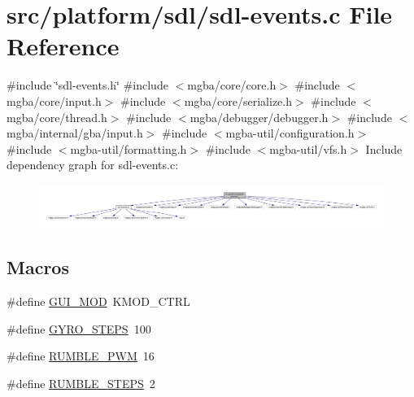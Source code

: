 \hypertarget{sdl-events_8c}{}\section{src/platform/sdl/sdl-\/events.c File Reference}
\label{sdl-events_8c}
{\ttfamily \#include \char`\"{}sdl-\/events.\+h\char`\"{}}\newline
{\ttfamily \#include $<$mgba/core/core.\+h$>$}\newline
{\ttfamily \#include $<$mgba/core/input.\+h$>$}\newline
{\ttfamily \#include $<$mgba/core/serialize.\+h$>$}\newline
{\ttfamily \#include $<$mgba/core/thread.\+h$>$}\newline
{\ttfamily \#include $<$mgba/debugger/debugger.\+h$>$}\newline
{\ttfamily \#include $<$mgba/internal/gba/input.\+h$>$}\newline
{\ttfamily \#include $<$mgba-\/util/configuration.\+h$>$}\newline
{\ttfamily \#include $<$mgba-\/util/formatting.\+h$>$}\newline
{\ttfamily \#include $<$mgba-\/util/vfs.\+h$>$}\newline
Include dependency graph for sdl-\/events.c\+:
\nopagebreak
\begin{figure}[H]
\begin{center}
\leavevmode
\includegraphics[width=350pt]{sdl-events_8c__incl}
\end{center}
\end{figure}
\subsection*{Macros}
\begin{DoxyCompactItemize}
\item 
\#define \mbox{\hyperlink{sdl-events_8c_a684c816c6f91dd4ba0f8528f8237aa1e}{G\+U\+I\+\_\+\+M\+OD}}~K\+M\+O\+D\+\_\+\+C\+T\+RL
\item 
\#define \mbox{\hyperlink{sdl-events_8c_a98c7010e7a9d56a72055e9f49d7166ec}{G\+Y\+R\+O\+\_\+\+S\+T\+E\+PS}}~100
\item 
\#define \mbox{\hyperlink{sdl-events_8c_a78991a7c3d24f2e9931a9a40efe5e878}{R\+U\+M\+B\+L\+E\+\_\+\+P\+WM}}~16
\item 
\#define \mbox{\hyperlink{sdl-events_8c_a91eca2f29d53a84d3e3a069b821aa04f}{R\+U\+M\+B\+L\+E\+\_\+\+S\+T\+E\+PS}}~2
\end{DoxyCompactItemize}
